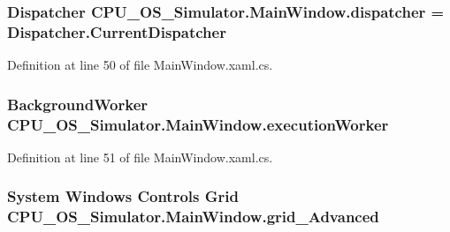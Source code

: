\subsubsection[{dispatcher}]{\setlength{\rightskip}{0pt plus 5cm}Dispatcher C\+P\+U\+\_\+\+O\+S\+\_\+\+Simulator.\+Main\+Window.\+dispatcher = Dispatcher.\+Current\+Dispatcher\hspace{0.3cm}{\ttfamily [private]}}\label{class_c_p_u___o_s___simulator_1_1_main_window_a5115439e688bb7ed25f5237b266e4f3f}


Definition at line 50 of file Main\+Window.\+xaml.\+cs.

\hypertarget{class_c_p_u___o_s___simulator_1_1_main_window_a80e0a87480e4b7f4cfdb47739985b7c7}{}
\subsubsection[{execution\+Worker}]{\setlength{\rightskip}{0pt plus 5cm}Background\+Worker C\+P\+U\+\_\+\+O\+S\+\_\+\+Simulator.\+Main\+Window.\+execution\+Worker\hspace{0.3cm}{\ttfamily [private]}}\label{class_c_p_u___o_s___simulator_1_1_main_window_a80e0a87480e4b7f4cfdb47739985b7c7}


Definition at line 51 of file Main\+Window.\+xaml.\+cs.

\hypertarget{class_c_p_u___o_s___simulator_1_1_main_window_a65cbc082cd4737ec0dd8837efa715510}{}
\subsubsection[{grid\+\_\+\+Advanced}]{\setlength{\rightskip}{0pt plus 5cm}System Windows Controls Grid C\+P\+U\+\_\+\+O\+S\+\_\+\+Simulator.\+Main\+Window.\+grid\+\_\+\+Advanced\hspace{0.3cm}{\ttfamily [package]}}\label{class_c_p_u___o_s___simulator_1_1_main_window_a65cbc082cd4737ec0dd8837efa715510}


